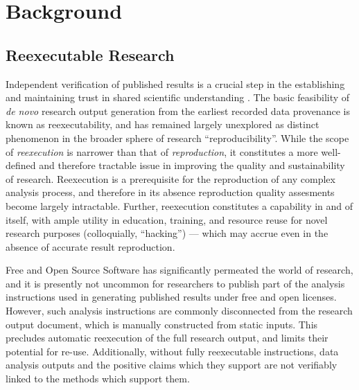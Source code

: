 \section{Background}

\subsection{Reexecutable Research}

Independent verification of published results is a crucial step in the establishing and maintaining trust in shared scientific understanding \cite{rpp}.
The basic feasibility of \textit{de novo} research output generation from the earliest recorded data provenance is known as reexecutability, and  has remained largely unexplored as distinct phenomenon in the broader sphere of research “reproducibility”.
While the scope of \textit{reexecution} is narrower than that of \textit{reproduction}, it constitutes a more well-defined and therefore tractable issue in improving the quality and sustainability of research.
Reexecution is a prerequisite for the reproduction of any complex analysis process, and therefore in its absence reproduction quality assesments become largely intractable.
Further, reexecution constitutes a capability in and of itself, with ample utility in education, training, and resource reuse for novel research purposes (colloquially, “hacking”) — which may accrue even in the absence of accurate result reproduction.

Free and Open Source Software \cite{foss} has significantly permeated the world of research, and it is presently not uncommon for researchers to publish part of the analysis instructions used in generating published results \cite{TODO} under free and open licenses.
However, such analysis instructions are commonly disconnected from the research output document, which is manually constructed from static inputs.
This precludes automatic reexecution of the full research output, and limits their potential for re-use.
Additionally, without fully reexecutable instructions, data analysis outputs and the positive claims which they support are not verifiably linked to the methods which support them.

